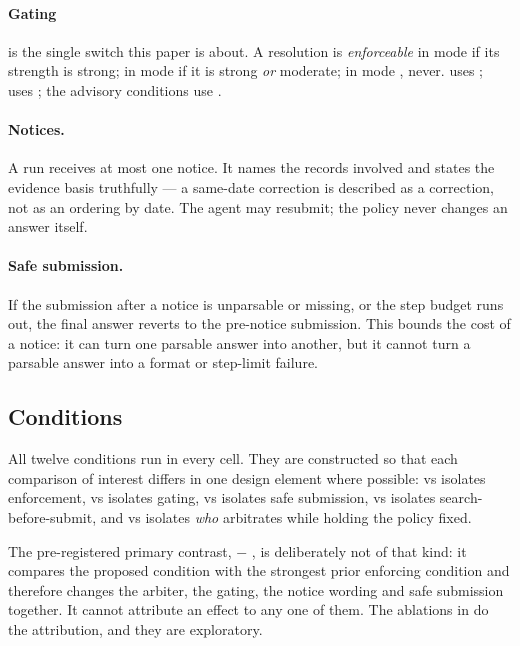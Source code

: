 \paragraph{Gating} is the single switch this paper is about. A resolution is \emph{enforceable} in mode
 if its strength is strong; in mode  if it is strong \emph{or} moderate; in mode ,
never.  uses ;  uses ; the advisory conditions use .

\paragraph{Notices.} A run receives at most one notice. It names the records involved and states the evidence basis
truthfully --- a same-date correction is described as a correction, not as an ordering by date. The agent may
resubmit; the policy never changes an answer itself.

\paragraph{Safe submission.} If the submission after a notice is unparsable or missing, or the step budget runs
out, the final answer reverts to the pre-notice submission. This bounds the cost of a notice: it can turn one
parsable answer into another, but it cannot turn a parsable answer into a format or step-limit failure.

\subsection{Conditions}
\label{sec:conditions}



All twelve conditions run in every cell. They are constructed so that each comparison of interest differs in one
design element where possible:  vs  isolates enforcement,  vs  isolates
gating,  vs  isolates safe submission,  vs  isolates
search-before-submit, and  vs  isolates \emph{who} arbitrates while holding the policy fixed.

The pre-registered primary contrast,  $-$ , is deliberately not of that kind: it compares the
proposed condition with the strongest prior enforcing condition and therefore changes the arbiter, the gating, the
notice wording and safe submission together. It cannot attribute an effect to any one of them. The ablations in
 do the attribution, and they are exploratory.

